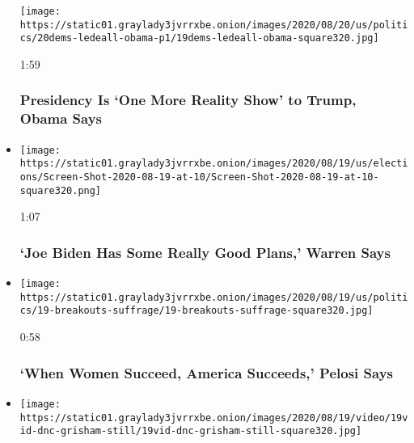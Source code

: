 \begin{itemize}
  \texttt{[image: https://static01.graylady3jvrrxbe.onion/images/2020/08/20/us/politics/20dems-ledeall-obama-p1/19dems-ledeall-obama-square320.jpg]}

  1:59

  \hypertarget{presidency-is-one-more-reality-show-to-trump-obama-says}{%
  \subsubsection{Presidency Is `One More Reality Show' to Trump, Obama
  Says}\label{presidency-is-one-more-reality-show-to-trump-obama-says}}
\item
  \href{https://www.nytimes3xbfgragh.onion/video/us/elections/100000007297591/elizabeth-warren-speaks-dnc.html?action=click\&module=video-series-bar\&region=header\&pgtype=Article\&playlistId=video/2020-Elections}{}

  \texttt{[image: https://static01.graylady3jvrrxbe.onion/images/2020/08/19/us/elections/Screen-Shot-2020-08-19-at-10/Screen-Shot-2020-08-19-at-10-square320.png]}

  1:07

  \hypertarget{joe-biden-has-some-really-good-plans-warren-says}{%
  \subsubsection{`Joe Biden Has Some Really Good Plans,' Warren
  Says}\label{joe-biden-has-some-really-good-plans-warren-says}}
\item
  \href{https://www.nytimes3xbfgragh.onion/video/us/elections/100000007297617/nancy-pelosi-speaks-dnc.html?action=click\&module=video-series-bar\&region=header\&pgtype=Article\&playlistId=video/2020-Elections}{}

  \texttt{[image: https://static01.graylady3jvrrxbe.onion/images/2020/08/19/us/politics/19-breakouts-suffrage/19-breakouts-suffrage-square320.jpg]}

  0:58

  \hypertarget{when-women-succeed-america-succeeds-pelosi-says}{%
  \subsubsection{`When Women Succeed, America Succeeds,' Pelosi
  Says}\label{when-women-succeed-america-succeeds-pelosi-says}}
\item
  \texttt{[image: https://static01.graylady3jvrrxbe.onion/images/2020/08/19/video/19vid-dnc-grisham-still/19vid-dnc-grisham-still-square320.jpg]}


\end{itemize}
